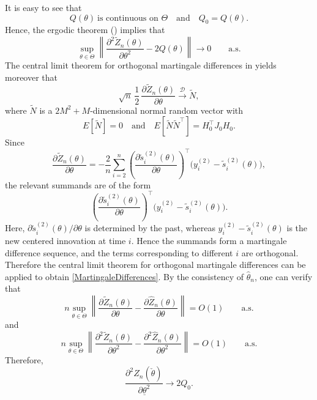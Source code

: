 \documentclass[12pt,a4paper]{article}
\theoremstyle{definition}
\begin{document}
It is easy to see that
\begin{equation}
Q(\theta)\ \text{is continuous on }\Theta
\quad\text{and}\quad
Q_0 = Q(\theta).
\end{equation}
Hence, the ergodic theorem ()
implies that
\begin{equation}
\sup_{\theta\in\Theta}
\left\|
\frac{\partial^2 \tilde Z_n(\theta)}{\partial \theta^2}
-
2Q(\theta)
\right\|
\to 0
\qquad \text{a.s.}
\end{equation}
The central limit theorem for orthogonal martingale differences in \citet{billingsley1968convergence} yields moreover that
\begin{equation}
\label{MartingaleDifferences}
\sqrt{n}\,\frac{1}{2}\,
\frac{\partial \tilde Z_n(\theta)}{\partial \theta}
\xrightarrow{\mathcal D}
\tilde N,
\end{equation}
where $\tilde N$ is a $2M^2+M$-dimensional normal random vector with
\[
E[\tilde N]=0
\quad\text{and}\quad
E[\tilde N\tilde N^\top]=H_0^\top J_0 H_0.
\]
Since
\[
\frac{\partial \tilde Z_n(\theta)}{\partial \theta}
=
-\frac{2}{n}\sum_{i=2}^n
\left(
\frac{\partial \tilde s_i^{(2)}(\theta)}{\partial \theta}
\right)^{\top}
\bigl(y_i^{(2)}-\tilde s_i^{(2)}(\theta)\bigr),
\]
the relevant summands are of the form
\[
\left(
\frac{\partial \tilde s_i^{(2)}(\theta)}{\partial \theta}
\right)^{\top}
\bigl(y_i^{(2)}-\tilde s_i^{(2)}(\theta)\bigr).
\]
Here,
\(
\partial \tilde s_i^{(2)}(\theta)/\partial \theta
\)
is determined by the past, whereas
\(
y_i^{(2)}-\tilde s_i^{(2)}(\theta)
\)
is the new centered innovation at time \(i\). Hence the summands form a martingale difference sequence, and the terms corresponding to different \(i\) are orthogonal. Therefore the central limit theorem for orthogonal martingale differences can be applied to obtain \cref{MartingaleDifferences}.
By the consistency of $\hat\theta_n$, one can verify that
\begin{equation}
n\sup_{\theta\in\Theta}
\left\|
\frac{\partial \tilde Z_n(\theta)}{\partial \theta}
-
\frac{\partial \hat Z_n(\theta)}{\partial \theta}
\right\|
=
O(1)
\qquad \text{a.s.}
\end{equation}
and
\begin{equation}
n\sup_{\theta\in\Theta}
\left\|
\frac{\partial^2 \tilde Z_n(\theta)}{\partial \theta^2}
-
\frac{\partial^2 \hat Z_n(\theta)}{\partial \theta^2}
\right\|
=
O(1)
\qquad \text{a.s.}
\end{equation}
Therefore, 
\begin{equation}
\frac{\partial^2 \hat{Z}_n(\check{\theta})}{\partial\underline{\theta}^2}  \to 2Q_0.
\end{equation}
\end{document}
